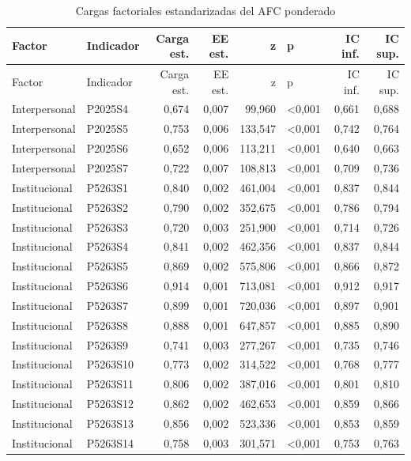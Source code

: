 
\begin{longtable}[t]{llrrrlrr}
\caption{Cargas factoriales estandarizadas del AFC ponderado}\\
\toprule
Factor & Indicador & Carga est. & EE est. & z & p & IC inf. & IC sup.\\
\midrule
\endfirsthead
\toprule
Factor & Indicador & Carga est. & EE est. & z & p & IC inf. & IC sup.\\
\midrule
\endhead
Interpersonal & P2025S4 & 0,674 & 0,007 & 99,960 & <0,001 & 0,661 & 0,688\\
Interpersonal & P2025S5 & 0,753 & 0,006 & 133,547 & <0,001 & 0,742 & 0,764\\
Interpersonal & P2025S6 & 0,652 & 0,006 & 113,211 & <0,001 & 0,640 & 0,663\\
Interpersonal & P2025S7 & 0,722 & 0,007 & 108,813 & <0,001 & 0,709 & 0,736\\
Institucional & P5263S1 & 0,840 & 0,002 & 461,004 & <0,001 & 0,837 & 0,844\\
\addlinespace
Institucional & P5263S2 & 0,790 & 0,002 & 352,675 & <0,001 & 0,786 & 0,794\\
Institucional & P5263S3 & 0,720 & 0,003 & 251,900 & <0,001 & 0,714 & 0,726\\
Institucional & P5263S4 & 0,841 & 0,002 & 462,356 & <0,001 & 0,837 & 0,844\\
Institucional & P5263S5 & 0,869 & 0,002 & 575,806 & <0,001 & 0,866 & 0,872\\
Institucional & P5263S6 & 0,914 & 0,001 & 713,081 & <0,001 & 0,912 & 0,917\\
\addlinespace
Institucional & P5263S7 & 0,899 & 0,001 & 720,036 & <0,001 & 0,897 & 0,901\\
Institucional & P5263S8 & 0,888 & 0,001 & 647,857 & <0,001 & 0,885 & 0,890\\
Institucional & P5263S9 & 0,741 & 0,003 & 277,267 & <0,001 & 0,735 & 0,746\\
Institucional & P5263S10 & 0,773 & 0,002 & 314,522 & <0,001 & 0,768 & 0,777\\
Institucional & P5263S11 & 0,806 & 0,002 & 387,016 & <0,001 & 0,801 & 0,810\\
\addlinespace
Institucional & P5263S12 & 0,862 & 0,002 & 462,653 & <0,001 & 0,859 & 0,866\\
Institucional & P5263S13 & 0,856 & 0,002 & 523,336 & <0,001 & 0,853 & 0,859\\
Institucional & P5263S14 & 0,758 & 0,003 & 301,571 & <0,001 & 0,753 & 0,763\\

\end{longtable}
